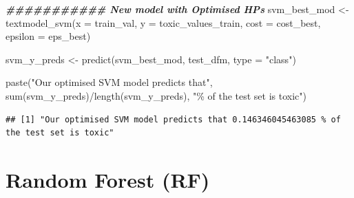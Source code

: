\documentclass[
]{article}
\newenvironment{Shaded}{\begin{snugshade}}{\end{snugshade}}
\newcommand{\AttributeTok}[1]{\textcolor[rgb]{0.77,0.63,0.00}{#1}}
\newcommand{\CommentTok}[1]{\textcolor[rgb]{0.56,0.35,0.01}{\textit{#1}}}
\newcommand{\ConstantTok}[1]{\textcolor[rgb]{0.00,0.00,0.00}{#1}}
\newcommand{\DocumentationTok}[1]{\textcolor[rgb]{0.56,0.35,0.01}{\textbf{\textit{#1}}}}
\newcommand{\FunctionTok}[1]{\textcolor[rgb]{0.00,0.00,0.00}{#1}}
\newcommand{\NormalTok}[1]{#1}
\newcommand{\OtherTok}[1]{\textcolor[rgb]{0.56,0.35,0.01}{#1}}
\newcommand{\SpecialCharTok}[1]{\textcolor[rgb]{0.00,0.00,0.00}{#1}}
\newcommand{\StringTok}[1]{\textcolor[rgb]{0.31,0.60,0.02}{#1}}
\begin{document}
\begin{Shaded}
\begin{Highlighting}[]
\DocumentationTok{\#\#\#\#\#\#\#\#\#\#\# New model with Optimised HPs}
\NormalTok{svm\_best\_mod }\OtherTok{\textless{}{-}} \FunctionTok{textmodel\_svm}\NormalTok{(}\AttributeTok{x =}\NormalTok{ train\_val, }\AttributeTok{y =}\NormalTok{ toxic\_values\_train, }
                        \AttributeTok{cost =}\NormalTok{ cost\_best, }\AttributeTok{epsilon =}\NormalTok{ eps\_best)}

\NormalTok{svm\_y\_preds }\OtherTok{\textless{}{-}} \FunctionTok{predict}\NormalTok{(svm\_best\_mod, test\_dfm, }\AttributeTok{type =} \StringTok{"class"}\NormalTok{)}

\FunctionTok{paste}\NormalTok{(}\StringTok{"Our optimised SVM model predicts that"}\NormalTok{, }\FunctionTok{sum}\NormalTok{(svm\_y\_preds)}\SpecialCharTok{/}\FunctionTok{length}\NormalTok{(svm\_y\_preds), }\StringTok{"\% of the test set is toxic"}\NormalTok{)}
\end{Highlighting}
\end{Shaded}

\begin{verbatim}
## [1] "Our optimised SVM model predicts that 0.146346045463085 % of the test set is toxic"
\end{verbatim}

\begin{Shaded}
\end{Shaded}

\hypertarget{random-forest-rf}{%
\section{Random Forest (RF)}\label{random-forest-rf}}
\end{document}
